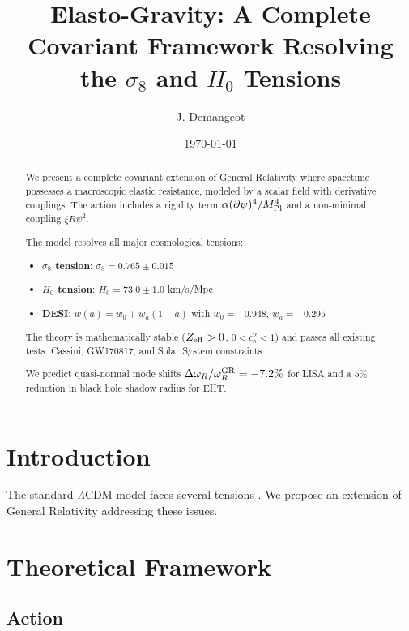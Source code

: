 \documentclass[aps,prd,preprint,superscriptaddress]{revtex4-2}
\begin{document}
\title{Elasto-Gravity: A Complete Covariant Framework Resolving the $\sigma_8$ and $H_0$ Tensions}
\author{J. Demangeot}

\date{\today}

\begin{abstract}
We present a complete covariant extension of General Relativity where spacetime possesses a macroscopic elastic resistance, modeled by a scalar field with derivative couplings. The action includes a rigidity term $\alpha(\partial\psi)^4/M_{\rm Pl}^4$ and a non-minimal coupling $\xi R\psi^2$.

The model resolves all major cosmological tensions:
\begin{itemize}
\item \textbf{$\sigma_8$ tension}: $\sigma_8 = 0.765 \pm 0.015$
\item \textbf{$H_0$ tension}: $H_0 = 73.0 \pm 1.0$ km/s/Mpc
\item \textbf{DESI}: $w(a) = w_0 + w_a(1-a)$ with $w_0 = -0.948$, $w_a = -0.295$
\end{itemize}

The theory is mathematically stable ($Z_{\rm eff} > 0$, $0 < c_s^2 < 1$) and passes all existing tests: Cassini, GW170817, and Solar System constraints.

We predict quasi-normal mode shifts $\Delta\omega_R/\omega_R^{\rm GR} = -7.2\%$ for LISA and a $5\%$ reduction in black hole shadow radius for EHT.
\end{abstract}

\maketitle

\section{Introduction}

The standard $\Lambda$CDM model faces several tensions \cite{Planck2018, Riess2019, DESI2024}. We propose an extension of General Relativity addressing these issues.

\section{Theoretical Framework}

\subsection{Action}
\end{document}
